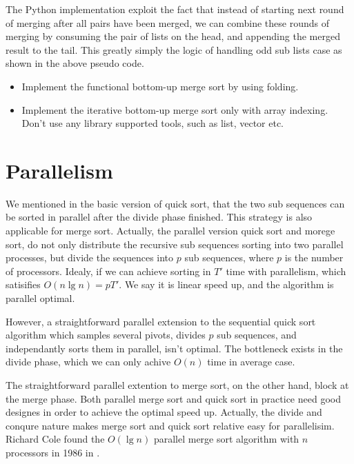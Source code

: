 \documentclass[UTF8]{article}
\begin{document}
The Python implementation exploit the fact that instead of starting next round of merging
after all pairs have been merged, we can combine these rounds of merging by consuming
the pair of lists on the head, and appending the merged result to the tail. This greatly simply
the logic of handling odd sub lists case as shown in the above pseudo code.

\begin{Exercise}
\begin{itemize}
\item Implement the functional bottom-up merge sort by using folding.
\item Implement the iterative bottom-up merge sort only with array indexing. Don't use any library
supported tools, such as list, vector etc.
\end{itemize}
\end{Exercise}

\section{Parallelism}
We mentioned in the basic version of quick sort, that the two sub sequences can be sorted in
parallel after the divide phase finished. This strategy is also applicable for merge sort.
Actually, the parallel version quick sort and morege sort, do not only distribute
the recursive sub sequences sorting into two parallel processes, but divide the sequences into
$p$ sub sequences, where $p$ is the number of processors. Idealy, if we can achieve
sorting in $T'$ time with parallelism, which satisifies $O(n \lg n) = p T'$. We say it
is linear speed up, and the algorithm is parallel optimal.

However, a straightforward parallel extension to the sequential quick sort algorithm
which samples several pivots, divides $p$ sub sequences, and independantly
sorts them in parallel, isn't optimal. The bottleneck exists in the
divide phase, which we can only achive $O(n)$ time in average case.

The straightforward parallel extention to merge sort, on the other hand, block
at the merge phase. Both parallel merge sort and quick sort in practice need
good designes in order to achieve the optimal speed up. Actually, the divide and
conqure nature makes merge sort and quick sort relative easy for parallelisim.
Richard Cole found the $O(\lg n)$ parallel merge sort algorithm with $n$ processors
in 1986 in \cite{para-msort}.
\end{document}
